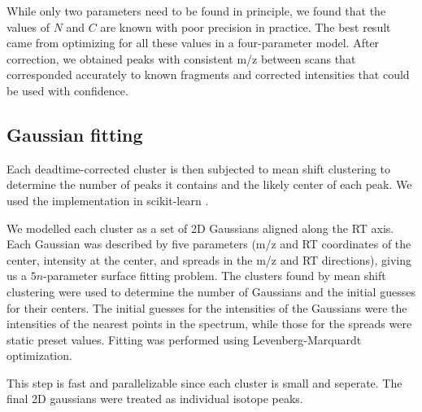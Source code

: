 \documentclass[10pt]{scrartcl}
\begin{document}
While only two parameters need to be found in principle, we found that the values of $N$ and $C$ are known with poor precision in practice. The best result came from optimizing for all these values in a four-parameter model. After correction, we obtained peaks with consistent m/z between scans that corresponded accurately to known fragments and corrected intensities that could be used with confidence.

\subsection{Gaussian fitting}
Each deadtime-corrected cluster is then subjected to mean shift clustering \cite{} to determine the number of peaks it contains and the likely center of each peak. We used the implementation in scikit-learn \cite{}.

We modelled each cluster as a set of 2D Gaussians aligned along the RT axis. Each Gaussian was described by five parameters (m/z and RT coordinates of the center, intensity at the center, and spreads in the m/z and RT directions), giving us a $5n$-parameter surface fitting problem. The clusters found by mean shift clustering were used to determine the number of Gaussians and the initial guesses for their centers. The initial guesses for the intensities of the Gaussians were the intensities of the nearest points in the spectrum, while those for the spreads were static preset values. Fitting was performed using Levenberg-Marquardt optimization.

This step is fast and parallelizable since each cluster is small and seperate. The final 2D gaussians were treated as individual isotope peaks. 


 
\end{document}
